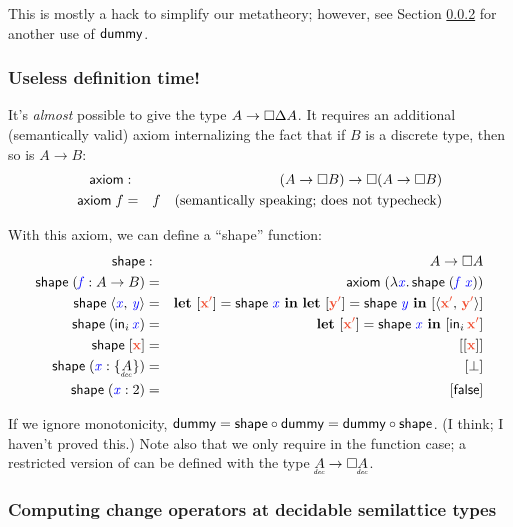 \documentclass{article}
\theoremstyle{plain}
\theoremstyle{definition}
\newcommand{\dummy}{\ms{dummy}}
\newcommand{\shape}{\ms{shape}}
\begin{document}
This is mostly a hack to simplify our metatheory; however, see Section \ref{sec:change-operators-at-decidable-semilattice-types} for another use of $\mathsf{dummy}$.


\subsubsection{Useless definition time!}

It's \emph{almost} possible to give \dummy{} the type $A \to \square{\Delta A}$.
%
It requires an additional (semantically valid) axiom internalizing the fact that if $B$ is a discrete type, then so is $A \to B$:
%
\begin{eqnarray*}
  \mathsf{axiom} &:& (A \to \square{B}) \to \square{(}A \to \square{B})\\
  \mathsf{axiom}\;f &=& f \quad\text{(semantically speaking; does not typecheck)}
\end{eqnarray*}

With this axiom, we can define a ``shape'' function:
%
\begin{eqnarray*}
  \shape &:& A \to \Disc{A}\\
  \shape\; (\m{f} : A \to B) &=&
    \ms{axiom}\; (\lam{\m{x}} \shape\; (\m{f}\;\m{x}))\\
  \shape\; \pair{\m{x}}{\m{y}} &=&
    \letdisc{\d{x'}}{\shape\;\m{x}}
    \letdisc{\d{y'}}{\shape\;\m{y}}
    \disc{\pair{\d{x'}}{\d{y'}}}\\
  \shape\; (\inj{i}{\m{x}}) &=&
    \letdisc{\d{x'}}{\shape\;\m x} \disc{\inj{i}{\d{x'}}}\\
  \shape\; \disc{\d{x}} &=& \disc{\disc{\d{x}}}\\
  \shape\; (\m{x} : \Seteq{A}) &=& \disc{\bot}\\
  \shape\; (\m{x} : 2) &=& \disc{\efalse}
\end{eqnarray*}

If we ignore monotonicity, $\dummy = \ms{shape} \circ \dummy = \dummy \circ \ms{shape}$. (I think; I haven't proved this.)
%
Note also that we only require  in the function case; a restricted version of  can be defined with the type $\eq{A} \to \Disc{\eq{A}}$.


\subsubsection{Computing change operators at decidable semilattice types}
\label{sec:change-operators-at-decidable-semilattice-types}
\end{document}
